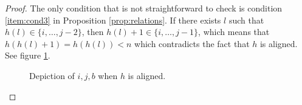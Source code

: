 \documentclass[10pt]{amsart}
\theoremstyle{definition}
\newcommand{\dyckpath}[2]{
\draw[line width=2pt] (#1) foreach \dir in {#2}{ -- ++(\dir*90:1)};
}
\newcommand{\dyckpathc}[3]{
\draw[line width=2pt, color=#3] (#1) foreach \dir in {#2}{ -- ++(\dir*90:1)};
}
\newcommand{\gline}[4]{
\draw[line width=#4 pt, color=#3] (#1) -- (#2);
}
\begin{document}
\begin{proof}
 The only condition that is not straightforward to check is condition \eqref{item:cond3} in Proposition \ref{prop:relations}. If there exists $l$ such that $h(l)\in \{i,\ldots, j-2\}$, then $h(l)+1\in \{i,\ldots, j-1\}$, which means that $h(h(l)+1)=h(h(l))<n$ which contradicts the fact that $h$ is aligned. See figure \ref{fig:condalig}.
\begin{figure}[htb]  \centering
{}
\caption{Depiction of $i,j,b$ when $h$ is aligned.}
\label{fig:condalig}
\end{figure}
\end{proof}
\end{document}
